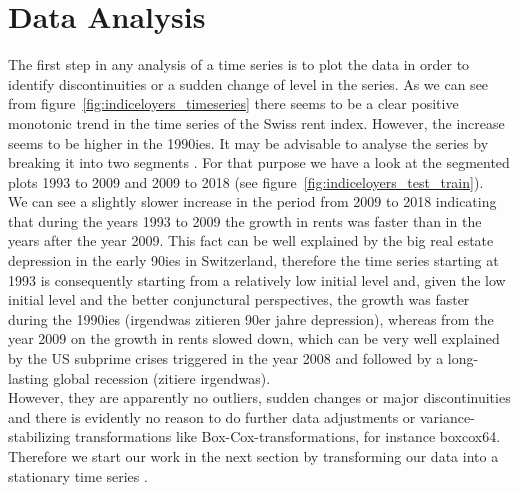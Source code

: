 \documentclass[11pt,a4paper]{article}
\begin{document}
\section{Data Analysis}
The first step in any analysis of a time series is to plot the data in order to identify discontinuities or a sudden change of level in the series\cite[p.~23]{bd02}. As we can see from figure~\ref{fig:indiceloyers_timeseries} there seems to be a clear positive monotonic trend in the time series of the Swiss rent index. However, the increase seems to be higher in the 1990ies. It may be advisable to analyse the series by breaking it into two segments \cite[p.~23]{bd02} . For that purpose we have a look at the segmented plots 1993 to 2009 and 2009 to 2018 (see figure~\ref{fig:indiceloyers_test_train}). \\
We can see a slightly slower increase in the period from 2009 to 2018 indicating that during the years 1993 to 2009 the growth in rents was faster than in the years after the year 2009. This fact can be well explained by the big real estate depression in the early 90ies in Switzerland, therefore the time series starting at 1993 is consequently starting from a relatively low initial level and, given the low initial level and the better conjunctural perspectives, the growth  was faster during the 1990ies (irgendwas zitieren 90er jahre depression), whereas from the year 2009 on the growth in rents slowed down, which can be very well explained by the US subprime crises triggered in the year 2008 and followed by a long-lasting global recession (zitiere irgendwas). \\
However, they are apparently no outliers, sudden changes or major discontinuities and there is evidently no reason to do further data adjustments or variance-stabilizing transformations like Box-Cox-transformations, for instance {boxcox64}. Therefore we start our work in the next section by transforming our data into a stationary time series \cite[p.~45--82]{bd02}.
\end{document}
